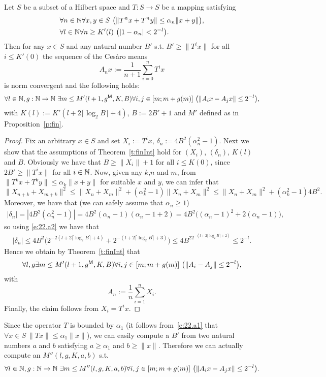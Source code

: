 \begin{cor} \label{c:fin22}
Let $S$ be a subset of a Hilbert space and $T:S\to S$
be a mapping satisfying
\begin{align}
&\forall n\in\mathbb{N}\forall x,y\in S\ \big(\| T^nx + T^ny \| \leq \alpha_n\|x + y\|\big), \label{e:22.a1}  \\  
&\forall l\in\mathbb{N}\forall n\geq K'(l)\ \big( |1-\alpha_{n}|<2^{-l}\big).  \label{e:22.a2}
\end{align}
Then for any $x\in S$ and any natural number $B'$ s.t. $B'\geq \|T^i x\|$ for all $i\leq K'(0)$ the sequence of the Ces{\`a}ro means
\[
A_nx:=\frac{1}{n+1}\sum^{n}_{i=0} T^i x
\]
is norm convergent and the following holds:
\[
\forall l\in\mathbb{N},g:\mathbb{N}\to\mathbb{N}\ \exists m\leq M'(l+1,g\protect{^{\textsf{\upshape M}}},K, B)\forall i,j\in[m;m+g(m)]\ \big( \|A_{i}x-A_{j}x\|\leq 2^{-l}\big ),
\]
with $K(l):=K'(l+2\lceil\log_2 B \rceil+4)$, $B:=2B'+1$ and $M'$ defined as in Proposition~\ref{p:fin}.
\end{cor}
\begin{proof}
Fix an arbitrary $x\in S$ and set $X_i:=T^ix$, $\delta_n:=4B^2(\alpha_n^2-1)$.
Next we show that the assumptions of Theorem~\ref{t:finInt} hold for
$(X_i)$, $(\delta_n)$, $K(l)$ and $B$. Obviously we have that $B\geq \|X_i\|+1$ for all $i\leq K(0)$, since $2B'\geq \|T^i x\|$ for all $i\in\mathbb{N}$.
Now, given any $k$,$n$ and $m$, from $\| T^kx + T^ky \| \leq \alpha_k\|x + y\|$ for suitable $x$ and $y$, we can infer that
\[
\|X_{n+k}\! + X_{m+k}\|^2 \leq \|X_{n}\! + X_{m}\|^2+(\alpha_k^2\!-\!1)\|X_{n}\! + X_{m}\|^2\leq \|X_{n}\! + X_{m}\|^2+(\alpha_k^2\!-\!1)4B^2\!.
\]
Moreover, we have that (we can safely assume that $\alpha_n\geq1$)
\begin{align*}
|\delta_n|=|4B^2(\alpha_n^2-1)|=4B^2(\alpha_n-1)(\alpha_n-1+2)=4B^2\big((\alpha_n-1)^2+2(\alpha_n-1)\big),
\end{align*}
so using \eqref{e:22.a2} we have that
\begin{align*}
|\delta_n|\leq 4B^2\big(2^{-2(l+2\lceil\log_2 B \rceil+4)}+2^{-(l+2\lceil\log_2 B \rceil+3)}\big)\leq 4B^22^{-(l+2\lceil\log_2 B \rceil+2)}\leq2^{-l}.
\end{align*}
Hence we obtain by Theorem~\ref{t:finInt} that
\[
\forall l,g \exists m\leq M'(l+1,g\protect{^{\textsf{\upshape M}}},K, B)\forall i,j\in[m;m+g(m)]\ \big( \|A_{i}-A_{j}\|\leq 2^{-l} \big),
\]
with
\[
A_n:=\frac{1}{n}\sum^n_{i=1}X_i.
\]
Finally, the claim follows from $X_i=T^ix$.
\end{proof}
%
\begin{rmk}

Since the operator $T$ is bounded by $\alpha_1$ (it follows from~\eqref{e:22.a1} that $\forall x\in S\ \|Tx\|\leq\alpha_1\|x\|$), we can easily compute a $B'$ from two natural numbers $a$ and $b$ satisfying $a\geq \alpha_1$ and $b\geq\|x\|$. Therefore we can actually compute an $M''(l,g,K,a,b)$ s.t.
\[
\forall l\in\mathbb{N},g:\mathbb{N}\to\mathbb{N}\ \exists m\leq M''(l,g,K,a,b)\forall i,j\in[m;m+g(m)]\ \big( \|A_{i}x-A_{j}x\|\leq 2^{-l}\big ).
\]
\end{rmk}


